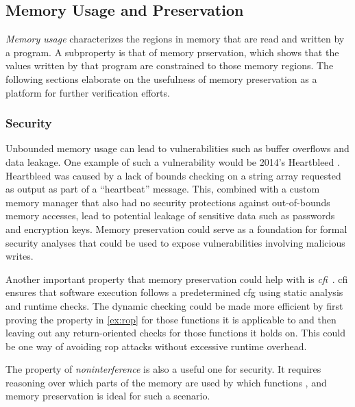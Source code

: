 \subsection{Memory Usage and Preservation}\label{memory_usage}
\emph{Memory usage} characterizes the regions in memory that are read and written by a program.
A subproperty is that of memory prservation,
which shows that the values written by that program are constrained to those memory regions.
The following sections elaborate on the usefulness of memory preservation
as a platform for further verification efforts.

\subsubsection{Security}
Unbounded memory usage can lead to vulnerabilities
such as buffer overflows and data leakage.
One example of such a vulnerability would be 2014's Heartbleed \autocite{heartbleed}.
Heartbleed was caused by a lack of bounds checking on a string array
requested as output as part of a ``heartbeat'' message.
This, combined with a custom memory manager
that also had no security protections against out-of-bounds memory accesses,
lead to potential leakage of sensitive data such as passwords and encryption keys.
Memory preservation could serve as a foundation for formal security analyses
that could be used to expose vulnerabilities involving malicious writes.

Another important property that memory preservation could help with
is \emph{\ac{cfi}}~\cite{abadi2009cfi}. \Ac{cfi} ensures that software execution
follows a predetermined \ac{cfg} using static analysis and runtime checks.
The dynamic checking could be made more efficient
by first proving the property in \cref{ex:rop} for those functions it is applicable to
and then leaving out any return-oriented checks for those functions it holds on.
This could be one way of avoiding \ac{rop} attacks without excessive runtime overhead.

The property of \emph{noninterference} is also a useful one for security.
It requires reasoning over which parts of the memory are used by which functions \autocite{rushby1992noninterference},
and memory preservation is ideal for such a scenario.

